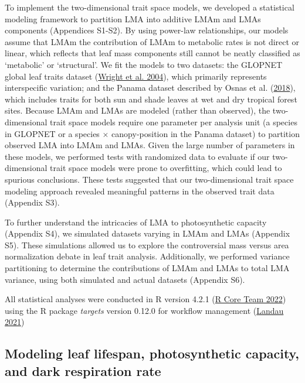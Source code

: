 \documentclass[
  12pt,
  letterpaper,
  DIV=11,
  numbers=noendperiod]{scrartcl}
\begin{document}
To implement the two-dimensional trait space models, we developed a
statistical modeling framework to partition LMA into additive LMAm and
LMAs components (Appendices S1-S2). By using power-law relationships,
our models assume that LMAm the contribution of LMAm to metabolic rates
is not direct or linear, which reflects that leaf mass components still
cannot be neatly classified as `metabolic' or `structural'. We fit the
models to two datasets: the GLOPNET global leaf traits dataset
(\protect\hyperlink{ref-Wright2004a}{Wright et al. 2004}), which
primarily represents interspecific variation; and the Panama dataset
described by Osnas et al. (\protect\hyperlink{ref-Osnas2018}{2018}),
which includes traits for both sun and shade leaves at wet and dry
tropical forest sites. Because LMAm and LMAs are modeled (rather than
observed), the two-dimensional trait space models require one parameter
per analysis unit (a species in GLOPNET or a species \(\times\)
canopy-position in the Panama dataset) to partition observed LMA into
LMAm and LMAs. Given the large number of parameters in these models, we
performed tests with randomized data to evaluate if our two-dimensional
trait space models were prone to overfitting, which could lead to
spurious conclusions. These tests suggested that our two-dimensional
trait space modeling approach revealed meaningful patterns in the
observed trait data (Appendix S3).

To further understand the intricacies of LMA to photosynthetic capacity
(Appendix S4), we simulated datasets varying in LMAm and LMAs (Appendix
S5). These simulations allowed us to explore the controversial mass
versus area normalization debate in leaf trait analysis. Additionally,
we performed variance partitioning to determine the contributions of
LMAm and LMAs to total LMA variance, using both simulated and actual
datasets (Appendix S6).

All statistical analyses were conducted in R version 4.2.1
(\protect\hyperlink{ref-RCoreTeam2022}{R Core Team 2022}) using the R
package \emph{targets} version 0.12.0 for workflow management
(\protect\hyperlink{ref-Landau2021}{Landau 2021})

\hypertarget{modeling-leaf-lifespan-photosynthetic-capacity-and-dark-respiration-rate}{%
\subsection{Modeling leaf lifespan, photosynthetic capacity, and dark
respiration
rate}\label{modeling-leaf-lifespan-photosynthetic-capacity-and-dark-respiration-rate}}
\end{document}
